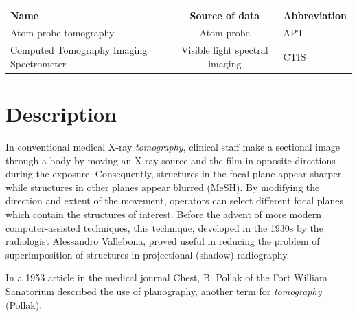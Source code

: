 \documentclass[a4paper,twoside,onecolumn]{report}
\begin{document}
\begin{tabularx}{\textwidth}{ || X | c | l || }
	\hline
	Name                                     & Source of data                 & Abbreviation \\
	\hline \hline
	Atom probe tomography                    & Atom probe                     & APT          \\
	\hline
	Computed Tomography Imaging Spectrometer & Visible light spectral imaging & CTIS         \\
	\hline
\end{tabularx}

\section{Description}
	In conventional medical X-ray \emph{tomography}, clinical staff make a sectional
	image through a body by moving an X-ray source and the film in opposite
	directions during the exposure. Consequently, structures in the focal plane
	appear sharper, while structures in other planes appear blurred (MeSH).
	By modifying the direction and extent of the movement, operators can select
	different focal planes which contain the structures of interest. Before the
	advent of more modern computer-assisted techniques, this technique,
	developed in the 1930s by the radiologist Alessandro Vallebona, proved
	useful in reducing the problem of superimposition of structures in
	projectional (shadow) radiography.

	In a 1953 article in the medical journal Chest, B. Pollak of the Fort
	William Sanatorium described the use of planography, another term for
	\emph{tomography} (Pollak).
\end{document}
